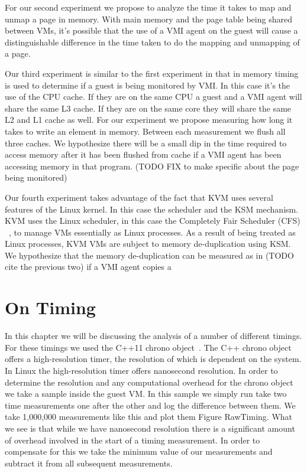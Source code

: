 For our second experiment we propose to analyze the time it takes to map and unmap a page in memory. With main memory and the page table being shared between VMs,  it's possible that the use of a VMI agent on the guest will cause a distinguishable difference in the time taken to do the mapping and unmapping of a page.

Our third experiment is similar to the first experiment in that in memory timing is used to determine if a guest is being monitored by VMI. In this case it's the use of the CPU cache. If they are on the same CPU a guest and a VMI agent will share the same L3 cache. If they are on the same core they will share the same L2 and L1 cache as well. For our experiment we propose measuring how long it takes to write an element in memory. Between each measurement we flush all three caches. We hypothesize there will be a small dip in the time required to access memory after it has been flushed from cache if a VMI agent has been accessing memory in that program. (TODO FIX to make specific about the page being monitored) 


Our fourth experiment takes advantage of the fact that KVM uses several features of the Linux kernel. In this case the scheduler and the KSM mechanism. KVM uses the Linux scheduler, in this case the Completely Fair Scheduler (CFS) ~\cite{pabla_completely_2009}, to manage VMs essentially as Linux processes. As a result of being treated as Linux processes, KVM VMs are subject to memory de-duplication using KSM. We hypothesize that the memory de-duplication can be measured as in (TODO cite the previous two) if a VMI agent copies a 

\section{On Timing}

In this chapter we will be discussing the analysis of a number of different timings. For these timings we used the C++11 chrono object~\cite{_chrono_2014}. The C++ chrono object offers a high-resolution timer, the resolution of which is dependent on the system. In Linux the high-resolution timer offers nanosecond resolution.  In order to determine the resolution and any computational overhead for the chrono object we take a sample inside the guest VM. In this sample we simply run take two time measurements one after the other and log the difference between them. We take 1,000,000 measurements like this and plot them Figure RawTiming. What we see is that while we have nanosecond resolution there is a significant amount of overhead involved in the start of a timing measurement. In order to compensate for this we take the minimum value of our measurements and subtract it from all subsequent measurements. 

